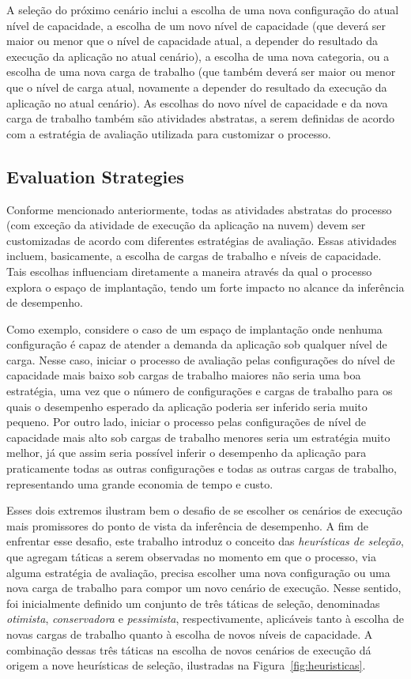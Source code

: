 \documentclass[10pt,conference,compsocconf]{IEEEtran}
\begin{document}
A seleção do próximo cenário inclui a escolha de uma nova configuração do atual nível de capacidade, a escolha de um novo nível de capacidade (que deverá ser maior ou menor que o nível de capacidade atual, a depender do resultado da execução da aplicação no atual cenário), a escolha de uma nova categoria, ou a escolha de uma nova carga de trabalho (que também deverá ser maior ou menor que o nível de carga atual, novamente a depender do resultado da execução da aplicação no atual cenário). As escolhas do novo nível de capacidade e da nova carga de trabalho também são atividades abstratas, a serem definidas de acordo com a estratégia de avaliação utilizada para customizar o processo. 


\subsection{Evaluation Strategies}\label{sec:strategies}

Conforme mencionado anteriormente, todas as atividades abstratas do processo (com exceção da atividade de execução da aplicação na nuvem) devem ser customizadas de acordo com diferentes estratégias de avaliação. Essas atividades incluem, basicamente, a escolha de cargas de trabalho e níveis de capacidade. Tais escolhas influenciam diretamente a maneira através da qual o processo explora o espaço de implantação, tendo um forte impacto no alcance da inferência de desempenho. 

Como exemplo, considere o caso de um espaço de implantação onde nenhuma configuração é capaz de atender a 
demanda da aplicação sob qualquer nível de carga. Nesse caso, iniciar o processo de avaliação pelas 
configurações do nível de capacidade mais baixo sob cargas de trabalho maiores não seria uma boa estratégia, 
uma vez que o número de configurações e cargas de trabalho para os quais o desempenho esperado da 
aplicação poderia ser inferido seria muito pequeno. Por outro lado, iniciar o processo pelas configurações de nível 
de capacidade mais alto sob cargas de trabalho menores seria um estratégia muito melhor, já que assim seria possível 
inferir o desempenho da aplicação para praticamente todas as outras
configurações e todas as outras cargas de trabalho, representando uma grande economia de tempo e custo.

Esses dois extremos ilustram bem o desafio de se escolher os cenários de execução mais promissores do ponto de vista da inferência de desempenho. A fim de enfrentar esse desafio, este trabalho introduz o conceito das {\em heurísticas de seleção}, que agregam táticas a serem observadas no momento em que o processo, via alguma estratégia de avaliação, precisa escolher uma nova configuração ou uma nova carga de trabalho para compor um novo cenário de execução. Nesse sentido, foi inicialmente definido um conjunto de três táticas de seleção, denominadas {\em otimista}, {\em conservadora} e {\em pessimista}, respectivamente, aplicáveis tanto à escolha de novas cargas de trabalho quanto à escolha de novos níveis de capacidade. A combinação dessas três táticas na escolha de novos cenários de execução dá origem a nove heurísticas de seleção, ilustradas na Figura~\ref{fig:heuristicas}.
\end{document}

